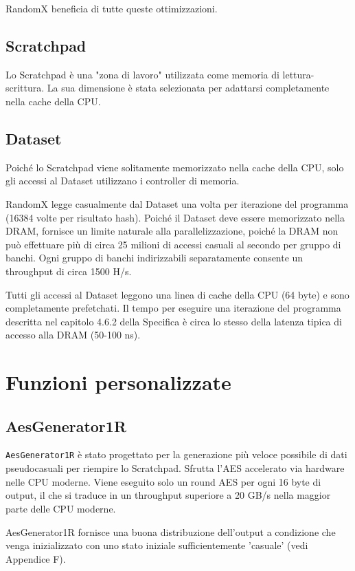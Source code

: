 RandomX beneficia di tutte queste ottimizzazioni.

\subsection{Scratchpad}

Lo Scratchpad è una "zona di lavoro" utilizzata come memoria di lettura-scrittura. La sua dimensione è stata selezionata per adattarsi completamente nella cache della CPU.

\subsection{Dataset}

Poiché lo Scratchpad viene solitamente memorizzato nella cache della CPU, solo gli accessi al Dataset utilizzano i controller di memoria.

RandomX legge casualmente dal Dataset una volta per iterazione del programma (16384 volte per risultato hash). Poiché il Dataset deve essere memorizzato nella DRAM, fornisce un limite naturale alla parallelizzazione, poiché la DRAM non può effettuare più di circa 25 milioni di accessi casuali al secondo per gruppo di banchi. Ogni gruppo di banchi indirizzabili separatamente consente un throughput di circa 1500 H/s.

Tutti gli accessi al Dataset leggono una linea di cache della CPU (64 byte) e sono completamente prefetchati. Il tempo per eseguire una iterazione del programma descritta nel capitolo 4.6.2 della Specifica è circa lo stesso della latenza tipica di accesso alla DRAM (50-100 ns).

\section{Funzioni personalizzate}

\subsection{AesGenerator1R}

\texttt{AesGenerator1R} è stato progettato per la generazione più veloce possibile di dati pseudocasuali per riempire lo Scratchpad. Sfrutta l'AES accelerato via hardware nelle CPU moderne. Viene eseguito solo un round AES per ogni 16 byte di output, il che si traduce in un throughput superiore a 20 GB/s nella maggior parte delle CPU moderne.

AesGenerator1R fornisce una buona distribuzione dell'output a condizione che venga inizializzato con uno stato iniziale sufficientemente 'casuale' (vedi Appendice F).

